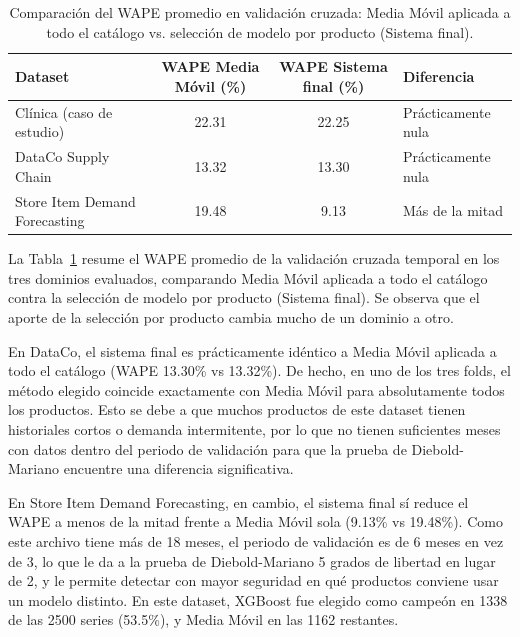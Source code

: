 \begin{table}[H]
\centering
\caption{Comparación del WAPE promedio en validación cruzada: Media Móvil aplicada a todo el catálogo vs. selección de modelo por producto (Sistema final).}
\label{tab:comparacion-cv-dominios}
\renewcommand{\arraystretch}{1.3}
\begin{tabularx}{\textwidth}{|X|c|c|X|}
\hline
\textbf{Dataset} & \textbf{WAPE Media Móvil (\%)} & \textbf{WAPE Sistema final (\%)} & \textbf{Diferencia} \\
\hline
Clínica (caso de estudio) & 22.31 & 22.25 & Prácticamente nula \\
\hline
DataCo Supply Chain & 13.32 & 13.30 & Prácticamente nula \\
\hline
Store Item Demand Forecasting & 19.48 & 9.13 & Más de la mitad \\
\hline
\end{tabularx}
\end{table}

La Tabla~\ref{tab:comparacion-cv-dominios} resume el WAPE promedio de la validación cruzada temporal en los tres dominios evaluados, comparando Media Móvil aplicada a todo el catálogo contra la selección de modelo por producto (Sistema final). Se observa que el aporte de la selección por producto cambia mucho de un dominio a otro.

En DataCo, el sistema final es prácticamente idéntico a Media Móvil aplicada a todo el catálogo (WAPE 13.30\% vs 13.32\%). De hecho, en uno de los tres folds, el método elegido coincide exactamente con Media Móvil para absolutamente todos los productos. Esto se debe a que muchos productos de este dataset tienen historiales cortos o demanda intermitente, por lo que no tienen suficientes meses con datos dentro del periodo de validación para que la prueba de Diebold-Mariano encuentre una diferencia significativa.

En Store Item Demand Forecasting, en cambio, el sistema final sí reduce el WAPE a menos de la mitad frente a Media Móvil sola (9.13\% vs 19.48\%). Como este archivo tiene más de 18 meses, el periodo de validación es de 6 meses en vez de 3, lo que le da a la prueba de Diebold-Mariano 5 grados de libertad en lugar de 2, y le permite detectar con mayor seguridad en qué productos conviene usar un modelo distinto. En este dataset, XGBoost fue elegido como campeón en 1338 de las 2500 series (53.5\%), y Media Móvil en las 1162 restantes.

